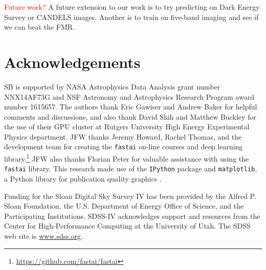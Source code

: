 \documentclass[fleqn,usenatbib]{mnras}
\newcommand{\editorial}[1]{\textcolor{red}{#1}}
\begin{document}
\editorial{Future work?}
A future extension to our work is to try predicting on Dark Energy Survey or CANDELS images.
Another is to train on five-band imaging and see if we can beat the FMR.


\section*{Acknowledgements}

SB is supported by NASA Astrophysics Data Analysis grant number NNX14AF73G and NSF Astronomy and Astrophysics Research Program award number 1615657.
The authors thank Eric Gawiser and Andrew Baker for helpful comments and discussions, and also thank David Shih and Matthew Buckley for the use of their GPU cluster at Rutgers University High Energy Experimental Physics department. %
JFW thanks Jeremy Howard, Rachel Thomas, and the development team for creating the \texttt{fastai} on-line courses and deep learning library.\footnote{\url{https://github.com/fastai/fastai}}
JFW also thanks Florian Peter for valuable assistance with using the \texttt{fastai} library.
This research made use of the {\tt IPython} package \citep{Perez2007} and {\tt matplotlib}, a Python library for publication quality graphics \citep{Hunter2007}.

Funding for the Sloan Digital Sky Survey IV has been provided by the Alfred P. Sloan Foundation, the U.S. Department of Energy Office of Science, and the Participating Institutions. SDSS-IV acknowledges
support and resources from the Center for High-Performance Computing at
the University of Utah. The SDSS web site is \url{www.sdss.org}.
\end{document}

